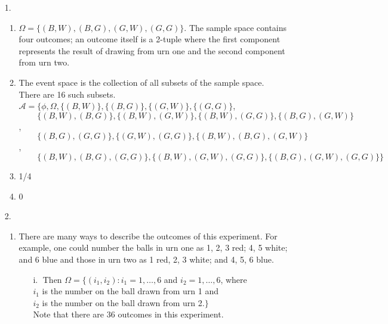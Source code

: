 \begin{enumerate}
	\item[1.] \begin{enumerate}
		
		\item $\Omega = \{(B,W), (B,G), (G,W), (G,G)\}$.  The sample space contains four outcomes; an outcome itself is a 2-tuple where the first component represents the result of drawing from urn one and the second component from urn two.
		
		\item The event space is the collection of all subsets of the sample space. \\
		There are 16 such subsets. \\
		${\mathscr A} = \Big\{ \phi, \Omega, \{(B,W)\}, \{(B,G)\}, \{(G,W)\}, \{(G,G)\}$, \\
		$\phantom{{\mathscr A} = }\{(B,W), (B,G)\}, \{(B,W),(G,W)\}, \{(B,W), (G,G)\}, \{(B,G), (G,W)\}$, \\ 
		$\phantom{{\mathscr A} = }\{(B,G),(G,G)\}, \{(G,W), (G,G)\}, \{(B,W), (B,G), (G,W)\}$,\\ 
		$\phantom{{\mathscr A} = }\{(B,W), (B,G), (G,G)\}, \{(B,W), (G,W), (G,G)\}, \{(B,G), (G,W), (G,G)\} \Big\}$

		\item 1/4
		
		\item 0
	
		\end{enumerate}
	\item[2.] \begin{enumerate}
		
		\item There are many ways to describe the outcomes of this experiment.  For example, one could number the balls in urn one as 1, 2, 3 red; 4, 5 white; and 6 blue and those in urn two as 1 red, 2, 3 white; and 4, 5, 6 blue.
		
		\begin{enumerate}
			
			\item[i.$\;$] Then $\Omega = \{(i_1,i_2)\colon i_1=1,\ldots,6$ and $i_2=1,\ldots, 6$, where \\
			$i_1$ is the number on the ball drawn from urn 1 and \\
			$i_2$ is the number on the ball drawn from urn 2.$\}$\\
			Note that there are 36 outcomes in this experiment. 
		

\end{enumerate}
\end{enumerate}
\end{enumerate}
